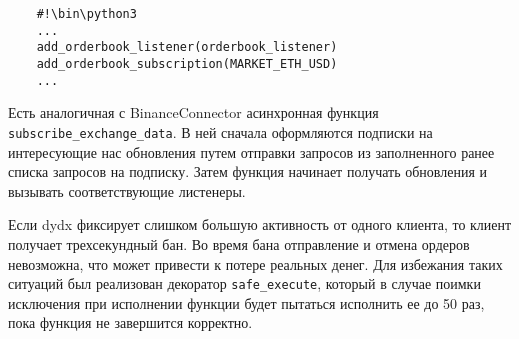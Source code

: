 \begin{verbatim}
    #!\bin\python3
    ...
    add_orderbook_listener(orderbook_listener)
    add_orderbook_subscription(MARKET_ETH_USD)
    ...
\end{verbatim}

Есть аналогичная с BinanceConnector асинхронная функция \texttt{subscribe\_exchange\_data}. В ней сначала оформляются подписки на интересующие нас обновления путем отправки запросов из заполненного ранее списка запросов на подписку. Затем функция начинает получать обновления и вызывать соответствующие листенеры.

Если dydx фиксирует слишком большую активность от одного клиента, то клиент получает трехсекундный бан. Во время бана отправление и отмена ордеров невозможна, что может привести к потере реальных денег. Для избежания таких ситуаций был реализован декоратор \texttt{safe\_execute}, который в случае поимки исключения при исполнении функции будет пытаться исполнить ее до 50 раз, пока функция не завершится корректно.

